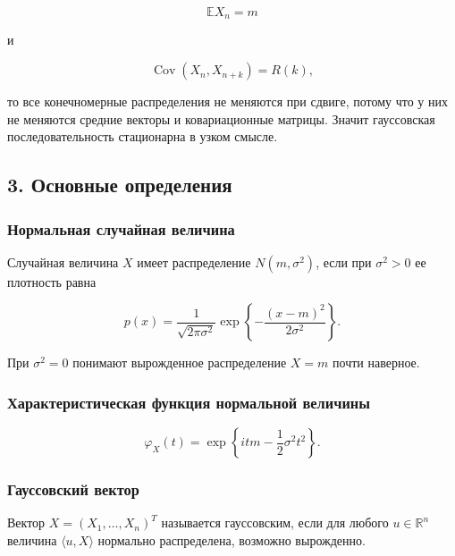 \documentclass[
  11pt,
  a4paper,
]{article}
\begin{document}
\[
\mathbb EX_n=m
\]

и

\[
\operatorname{Cov}(X_n,X_{n+k})=R(k),
\]

то все конечномерные распределения не меняются при сдвиге, потому что у
них не меняются средние векторы и ковариационные матрицы. Значит
гауссовская последовательность стационарна в узком смысле.

\subsection{3. Основные
определения}\label{ux43eux441ux43dux43eux432ux43dux44bux435-ux43eux43fux440ux435ux434ux435ux43bux435ux43dux438ux44f}

\subsubsection{Нормальная случайная
величина}\label{ux43dux43eux440ux43cux430ux43bux44cux43dux430ux44f-ux441ux43bux443ux447ux430ux439ux43dux430ux44f-ux432ux435ux43bux438ux447ux438ux43dux430}

Случайная величина \(X\) имеет распределение \(N(m,\sigma^2)\), если при
\(\sigma^2>0\) ее плотность равна

\[
p(x)=\frac1{\sqrt{2\pi\sigma^2}}
\exp\left\{-\frac{(x-m)^2}{2\sigma^2}\right\}.
\]

При \(\sigma^2=0\) понимают вырожденное распределение \(X=m\) почти
наверное.

\subsubsection{Характеристическая функция нормальной
величины}\label{ux445ux430ux440ux430ux43aux442ux435ux440ux438ux441ux442ux438ux447ux435ux441ux43aux430ux44f-ux444ux443ux43dux43aux446ux438ux44f-ux43dux43eux440ux43cux430ux43bux44cux43dux43eux439-ux432ux435ux43bux438ux447ux438ux43dux44b}

\[
\varphi_X(t)=\exp\left\{itm-\frac12\sigma^2t^2\right\}.
\]

\subsubsection{Гауссовский
вектор}\label{ux433ux430ux443ux441ux441ux43eux432ux441ux43aux438ux439-ux432ux435ux43aux442ux43eux440}

Вектор \(X=(X_1,\ldots,X_n)^T\) называется гауссовским, если для любого
\(u\in\mathbb R^n\) величина \(\langle u,X\rangle\) нормально
распределена, возможно вырожденно.
\end{document}
